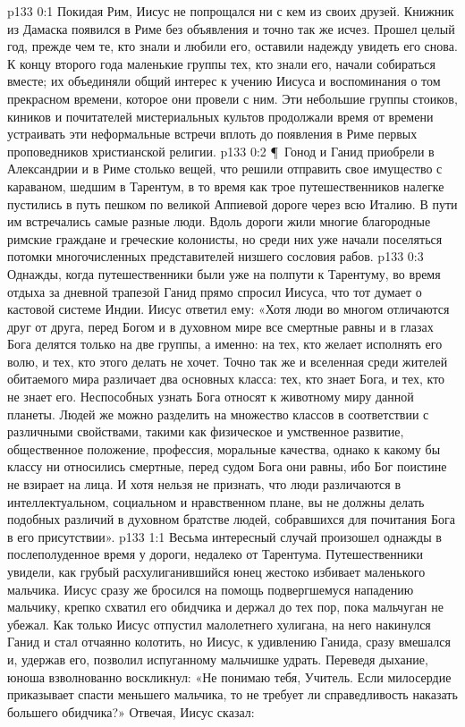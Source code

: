 \vs p133 0:1 Покидая Рим, Иисус не попрощался ни с кем из своих друзей. Книжник из Дамаска появился в Риме без объявления и точно так же исчез. Прошел целый год, прежде чем те, кто знали и любили его, оставили надежду увидеть его снова. К концу второго года маленькие группы тех, кто знали его, начали собираться вместе; их объединяли общий интерес к учению Иисуса и воспоминания о том прекрасном времени, которое они провели с ним. Эти небольшие группы стоиков, киников и почитателей мистериальных культов продолжали время от времени устраивать эти неформальные встречи вплоть до появления в Риме первых проповедников христианской религии.
\vs p133 0:2 \P\ Гонод и Ганид приобрели в Александрии и в Риме столько вещей, что решили отправить свое имущество с караваном, шедшим в Тарентум, в то время как трое путешественников налегке пустились в путь пешком по великой Аппиевой дороге через всю Италию. В пути им встречались самые разные люди. Вдоль дороги жили многие благородные римские граждане и греческие колонисты, но среди них уже начали поселяться потомки многочисленных представителей низшего сословия рабов.
\vs p133 0:3 Однажды, когда путешественники были уже на полпути к Тарентуму, во время отдыха за дневной трапезой Ганид прямо спросил Иисуса, что тот думает о кастовой системе Индии. Иисус ответил ему: «Хотя люди во многом отличаются друг от друга, перед Богом и в духовном мире все смертные равны и в глазах Бога делятся только на две группы, а именно: на тех, кто желает исполнять его волю, и тех, кто этого делать не хочет. Точно так же и вселенная среди жителей обитаемого мира различает два основных класса: тех, кто знает Бога, и тех, кто не знает его. Неспособных узнать Бога относят к животному миру данной планеты. Людей же можно разделить на множество классов в соответствии с различными свойствами, такими как физическое и умственное развитие, общественное положение, профессия, моральные качества, однако к какому бы классу ни относились смертные, перед судом Бога они равны, ибо Бог поистине не взирает на лица. И хотя нельзя не признать, что люди различаются в интеллектуальном, социальном и нравственном плане, вы не должны делать подобных различий в духовном братстве людей, собравшихся для почитания Бога в его присутствии».
\vs p133 1:1 Весьма интересный случай произошел однажды в послеполуденное время у дороги, недалеко от Тарентума. Путешественники увидели, как грубый расхулиганившийся юнец жестоко избивает маленького мальчика. Иисус сразу же бросился на помощь подвергшемуся нападению мальчику, крепко схватил его обидчика и держал до тех пор, пока мальчуган не убежал. Как только Иисус отпустил малолетнего хулигана, на него накинулся Ганид и стал отчаянно колотить, но Иисус, к удивлению Ганида, сразу вмешался и, удержав его, позволил испуганному мальчишке удрать. Переведя дыхание, юноша взволнованно воскликнул: «Не понимаю тебя, Учитель. Если милосердие приказывает спасти меньшего мальчика, то не требует ли справедливость наказать большего обидчика?» Отвечая, Иисус сказал:
